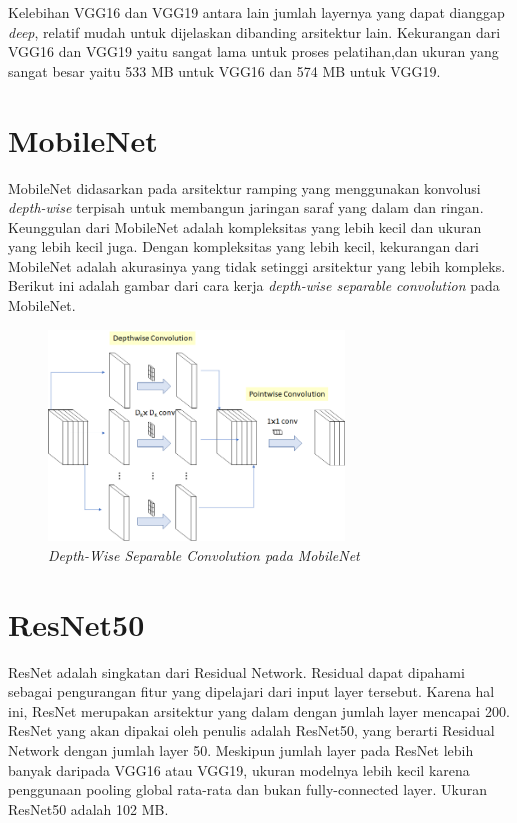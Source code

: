\par Kelebihan VGG16 dan VGG19 antara lain jumlah layernya yang dapat dianggap \textit{deep}, relatif mudah untuk dijelaskan dibanding arsitektur lain. Kekurangan dari VGG16 dan VGG19 yaitu sangat lama untuk proses pelatihan,dan ukuran yang sangat besar yaitu 533 MB untuk VGG16 dan 574 MB untuk VGG19.


\section{MobileNet}
\par MobileNet didasarkan pada arsitektur ramping yang menggunakan konvolusi \textit{depth-wise} terpisah untuk membangun jaringan saraf yang dalam dan ringan\cite{mobilenet_def}. Keunggulan dari MobileNet adalah kompleksitas yang lebih kecil dan ukuran yang lebih kecil juga. Dengan kompleksitas yang lebih kecil, kekurangan dari MobileNet adalah akurasinya yang tidak setinggi arsitektur yang lebih kompleks. Berikut ini adalah gambar dari cara kerja \textit{depth-wise separable convolution} pada MobileNet.

\begin{figure}[!ht]
	\centering\includegraphics[width=0.7\textwidth]{bab2/figures/mobilenet.png}
	\caption{\textit{Depth-Wise Separable Convolution pada MobileNet}\cite{mobilenet_def}}
	\label{fig:abstraksi1}
\end{figure}

\section{ResNet50}
\par ResNet adalah singkatan dari Residual Network. Residual dapat dipahami sebagai pengurangan fitur yang dipelajari dari input layer tersebut\cite{resnet_def}. Karena hal ini, ResNet merupakan arsitektur yang dalam dengan jumlah layer mencapai 200. ResNet yang akan dipakai oleh penulis adalah ResNet50, yang berarti Residual Network dengan jumlah layer 50. Meskipun jumlah layer pada ResNet lebih banyak daripada VGG16 atau VGG19, ukuran modelnya lebih kecil karena penggunaan pooling global rata-rata dan bukan fully-connected layer. Ukuran ResNet50 adalah 102 MB.

